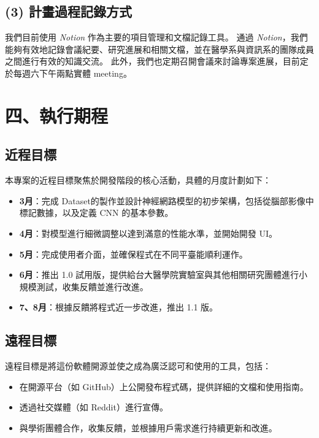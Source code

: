 \documentclass[12pt,a4paper]{article}
\begin{document}
\subsection*{(3) 計畫過程記錄方式}
我們目前使用 \textit{Notion} 作為主要的項目管理和文檔記錄工具。
通過 \textit{Notion}，我們能夠有效地記錄會議紀要、研究進展和相關文檔，並在醫學系與資訊系的團隊成員之間進行有效的知識交流。
此外，我們也定期召開會議來討論專案進展，目前定於每週六下午兩點實體 meeting。


\section*{四、執行期程}

\subsection*{近程目標}
本專案的近程目標聚焦於開發階段的核心活動，具體的月度計劃如下：
\begin{itemize}
    \item \textbf{3月}：完成 Dataset的製作並設計神經網路模型的初步架構，包括從腦部影像中標記數據，以及定義 CNN 的基本參數。
    \item \textbf{4月}：對模型進行細微調整以達到滿意的性能水準，並開始開發 UI。
    \item \textbf{5月}：完成使用者介面，並確保程式在不同平臺能順利運作。
    \item \textbf{6月}：推出 1.0 試用版，提供給台大醫學院實驗室與其他相關研究團體進行小規模測試，收集反饋並進行改進。
    \item \textbf{7、8月}：根據反饋將程式近一步改進，推出 1.1 版。
\end{itemize}

\subsection*{遠程目標}
遠程目標是將這份軟體開源並使之成為廣泛認可和使用的工具，包括：
\begin{itemize}
    \item 在開源平台（如 GitHub）上公開發布程式碼，提供詳細的文檔和使用指南。
    \item 透過社交媒體（如 Reddit）進行宣傳。
    \item 與學術團體合作，收集反饋，並根據用戶需求進行持續更新和改進。
\end{itemize}
\end{document}
